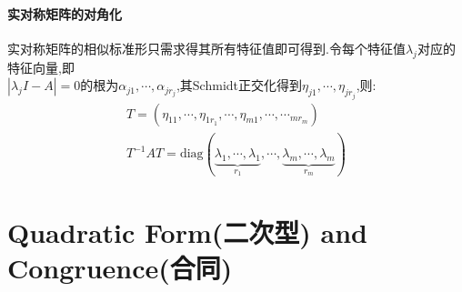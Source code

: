 \documentclass[UTF8,a4paper,notitlepage]{book}
\begin{document}
        \paragraph{实对称矩阵的对角化}实对称矩阵的相似标准形只需求得其所有特征值即可得到.令每个特征值$\lambda_j$对应的特征向量,即\\ 
        $|\lambda_j I-A|=0$的根为$\alpha_{j1},\cdots,\alpha_{jr_j}$,其Schmidt正交化得到$\eta_{j1},\cdots,\eta_{jr_j}$,则:\begin{eqnarray*}
            T=(\eta_{11},\cdots,\eta_{1r_1},\cdots,\eta_{m1},\cdots,\cdots_{mr_m})\\ 
            T^{-1}AT=\mathrm{diag}(\underbrace{\lambda_1,\cdots,\lambda_1}_{r_1},\cdots,\underbrace{\lambda_m,\cdots,\lambda_m}_{r_m})
        \end{eqnarray*}
        \section{Quadratic Form(二次型) and Congruence(合同)}
\end{document}

